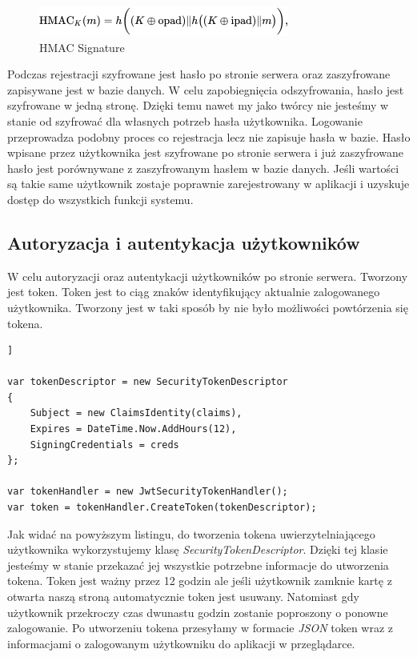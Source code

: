 \documentclass[12pt,a4paper]{article}
\begin{document}
\begin{figure}[H]
	\centering
	\includegraphics[width=0.7\linewidth]{hmac_signature}
	\caption{HMAC Signature}
	\label{fig:hmac_signature}
\end{figure}

\hspace*{0.7cm} Podczas rejestracji szyfrowane jest hasło po stronie serwera oraz zaszyfrowane zapisywane jest w bazie danych. W celu zapobiegnięcia odszyfrowania, hasło jest szyfrowane w jedną stronę. Dzięki temu nawet my jako twórcy nie jesteśmy w stanie od szyfrować dla własnych potrzeb hasła użytkownika. Logowanie przeprowadza podobny proces co rejestracja lecz nie zapisuje hasła w bazie. Hasło wpisane przez użytkownika jest szyfrowane po stronie serwera i już zaszyfrowane hasło jest porównywane z zaszyfrowanym hasłem w bazie danych. Jeśli wartości są takie same użytkownik zostaje poprawnie zarejestrowany w aplikacji i uzyskuje dostęp do wszystkich funkcji systemu.

\subsection{Autoryzacja i autentykacja użytkowników}

\hspace*{0.7cm} W celu autoryzacji oraz autentykacji użytkowników po stronie serwera. Tworzony jest token. Token jest to ciąg znaków identyfikujący aktualnie zalogowanego użytkownika. Tworzony jest w taki sposób by nie było możliwości powtórzenia się tokena.

\begin{lstlisting}[caption={Tworzenie tokena przy logowaniu}]]

var tokenDescriptor = new SecurityTokenDescriptor
{
	Subject = new ClaimsIdentity(claims),
	Expires = DateTime.Now.AddHours(12),
	SigningCredentials = creds
};

var tokenHandler = new JwtSecurityTokenHandler();
var token = tokenHandler.CreateToken(tokenDescriptor);

\end{lstlisting}

\hspace*{0.7cm} Jak widać na powyższym listingu, do tworzenia tokena uwierzytelniającego użytkownika wykorzystujemy klasę \textit{SecurityTokenDescriptor}. Dzięki tej klasie jesteśmy w stanie przekazać jej wszystkie potrzebne informacje do utworzenia tokena. Token jest ważny przez 12 godzin ale jeśli użytkownik zamknie kartę z otwarta naszą stroną automatycznie token jest usuwany. Natomiast gdy użytkownik przekroczy czas dwunastu godzin zostanie poproszony o ponowne zalogowanie. Po utworzeniu tokena przesyłamy w formacie \textit{JSON} token wraz z informacjami o zalogowanym użytkowniku do aplikacji w przeglądarce.
\end{document}
